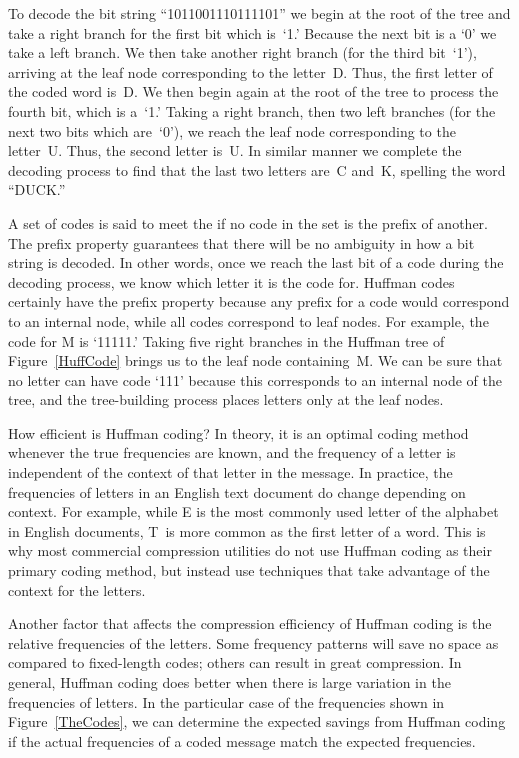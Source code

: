 \begin{example}
To decode the bit string ``1011001110111101'' we begin at
the root of the tree and take a right branch for the first bit which
is~`1.'
Because the next bit is a `0' we take a left branch.
We then take another right branch (for the third bit~`1'), arriving at
the leaf node corresponding to the letter~D.
Thus, the first letter of the coded word is~D.
We then begin again at the root of the tree to
process the fourth bit, which is a~`1.'
Taking a right branch, then two left branches (for the next two bits
which are~`0'), we reach the leaf node corresponding to the letter~U.
Thus, the second letter is~U.
In similar manner we complete the decoding process to find that the
last two letters are~C and~K, spelling the word ``DUCK.''
\end{example}

A set of codes is said to meet
the  if no code in the set is the prefix
of another.
The prefix property guarantees that there will be no ambiguity
in how a bit string is decoded.
In other words, once we reach the last bit of a code during the
decoding process, we know which letter it is the code for.
Huffman codes certainly have the prefix property because any prefix
for a code would correspond to an internal node, while all codes
correspond to leaf nodes.
For example, the code for M is `11111.'
Taking five right branches in the Huffman tree of
Figure~\ref{HuffCode} brings us to the leaf node containing~M.
We can be sure that no letter can have code `111' because this
corresponds to an internal node of the tree, and the tree-building
process places letters only at the leaf nodes.

How efficient is Huffman coding?
In theory, it is an optimal coding method whenever the true
frequencies are known, and the frequency of a letter is independent of
the context of that letter in the message.
In practice, the frequencies of letters in an English text document do
change depending on context.
For example, while E is the most commonly used letter of the
alphabet in English documents, T~is more common as the first letter
of a word.
This is why most commercial compression utilities do not use Huffman
coding as their primary coding method, but instead use techniques that
take advantage of the context for the letters.

Another factor that affects the compression efficiency of Huffman
coding is the relative frequencies of the letters.
Some frequency patterns will save no space as compared to fixed-length
codes; others can result in great compression.
In general, Huffman coding does better when there is
large variation in the frequencies of letters.
In the particular case of the frequencies shown in
Figure~\ref{TheCodes},
we can determine the expected savings from Huffman coding if the
actual frequencies of a coded message match the expected frequencies.

